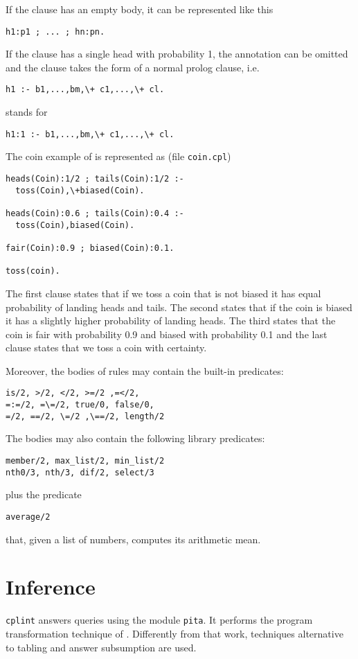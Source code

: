 \documentclass[a4paper,10pt]{article}
\begin{document}
If the clause has an empty body, it can be represented like this
\begin{verbatim}
h1:p1 ; ... ; hn:pn.
\end{verbatim}
If the clause has a single head with probability 1, the annotation can be omitted and the clause takes the form of a normal prolog clause, i.e. 
\begin{verbatim}
h1 :- b1,...,bm,\+ c1,...,\+ cl.
\end{verbatim}
stands for 
\begin{verbatim}
h1:1 :- b1,...,bm,\+ c1,...,\+ cl.
\end{verbatim}
The coin example of  \cite{VenVer04-ICLP04-IC} is represented as (file \texttt{coin.cpl})
\begin{verbatim}
heads(Coin):1/2 ; tails(Coin):1/2 :- 
  toss(Coin),\+biased(Coin).

heads(Coin):0.6 ; tails(Coin):0.4 :- 
  toss(Coin),biased(Coin).

fair(Coin):0.9 ; biased(Coin):0.1.

toss(coin).
\end{verbatim}
The first clause states that if we toss a coin that is not biased it has equal probability of landing heads and tails. The second states that if the coin is biased it has a slightly higher probability of landing heads. The third states that the coin is fair with probability 0.9 and biased with probability 0.1 and the last clause states that we toss a coin with certainty.

Moreover, the bodies of rules may contain the built-in predicates:
\begin{verbatim}
is/2, >/2, </2, >=/2 ,=</2,
=:=/2, =\=/2, true/0, false/0,
=/2, ==/2, \=/2 ,\==/2, length/2
\end{verbatim}
The bodies may also contain the following
 library predicates:
\begin{verbatim}
member/2, max_list/2, min_list/2
nth0/3, nth/3, dif/2, select/3
\end{verbatim}
plus the predicate
\begin{verbatim}
average/2
\end{verbatim}
that, given a list of numbers, computes its arithmetic mean.

\section{Inference}
\texttt{cplint} answers queries using the module \verb|pita|. It performs the program transformation technique of \cite{RigSwi10-ICLP10-IC}. Differently from that work, techniques alternative to tabling and answer subsumption are used.
\end{document}
